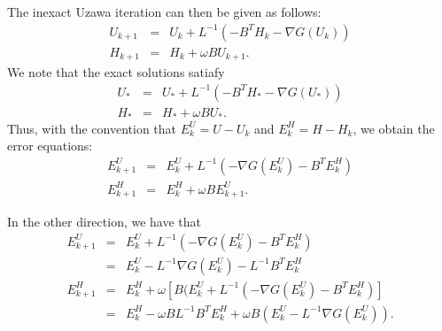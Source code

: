 The inexact Uzawa iteration can then be given as follows: 
\begin{eqnarray}
U_{k+1} &=& U_k + L^{-1} (-B^T H_k - \nabla G( U_k)) \\
H_{k+1} &=& H_k + \omega B U_{k+1}. 
\end{eqnarray}
We note that the exact solutions satiafy \begin{eqnarray}
U_{*} &=& U_{*} + L^{-1} (-B^T H_{*}-\nabla G (U_{*})) \\
H_{*} &=& H_{*} + \omega B U_{*}. 
\end{eqnarray}
Thus, with the convention that $E_{k}^U = U - U_k$ and $E_{k}^H = H - H_k$, we obtain the error equations: 
\begin{eqnarray}
E^U_{k+1} &=& E^U_k + L^{-1} (-\nabla G(E^U_k) -B^T E^H_k) \\
E^H_{k+1} &=& E^H_k + \omega B E^U_{k+1}. 
\end{eqnarray}
\begin{comment} 
In the matrix form, we have 
\begin{equation}
    \begin{pmatrix} 
     I  & 0 \\
      -\omega B & I
    \end{pmatrix} 
        \begin{pmatrix} 
      E^U_{k+1} \\
       E^H_{k+1}
    \end{pmatrix}  = 
        \begin{pmatrix} 
     I - L^{-1} A & -L^{-1} B^T \\
    0 & I
    \end{pmatrix} 
            \begin{pmatrix} 
      E^U_{k} \\
       E^H_{k}
    \end{pmatrix} 
\end{equation}
\end{comment} 
In the other direction, we have that 
\begin{eqnarray}
E^U_{k+1} &=& E^U_k + L^{-1} (- \nabla G(E^U_k) - B^T E^H_k) \\
          &=& E^U_k - L^{-1} \nabla G(E^U_k) - L^{-1} B^T E^H_k \\
E^H_{k+1} &=& E^H_k + \omega \left [ B (E^U_k + L^{-1} (- \nabla G(E_k^U) - B^T E^H_k) \right ] \\
&=& E^H_k - \omega B L^{-1} B^T E_k^H + \omega B (E_k^U - L^{-1} \nabla G(E_k^U)). 
\end{eqnarray}

